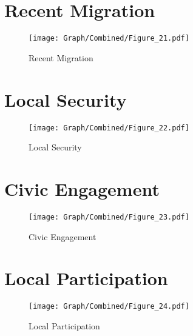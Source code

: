 \documentclass[10pt,a4paper]{article}
\begin{document}
\section{Recent Migration}
\begin{table}[H]\centering

\end{table}
\begin{figure}[H]\centering
\texttt{[image: Graph/Combined/Figure\_21.pdf]}
\caption{Recent Migration} \label{fig:Fig_21}
\end{figure}
\begin{table}[H]\centering

\end{table}
\pagebreak
\section{Local Security}
\begin{table}[H]\centering

\end{table}
\begin{figure}[H]\centering
\texttt{[image: Graph/Combined/Figure\_22.pdf]}
\caption{Local Security} \label{fig:Fig_22}
\end{figure}
\begin{table}[H]\centering

\end{table}
\pagebreak
\section{Civic Engagement}
\begin{table}[H]\centering

\end{table}
\begin{figure}[H]\centering
\texttt{[image: Graph/Combined/Figure\_23.pdf]}
\caption{Civic Engagement} \label{fig:Fig_23}
\end{figure}
\begin{table}[H]\centering

\end{table}
\pagebreak
\section{Local Participation}
\begin{table}[H]\centering

\end{table}
\begin{figure}[H]\centering
\texttt{[image: Graph/Combined/Figure\_24.pdf]}
\caption{Local Participation} \label{fig:Fig_24}
\end{figure}
\begin{table}[H]\centering

\end{table}
\pagebreak
\end{document}
